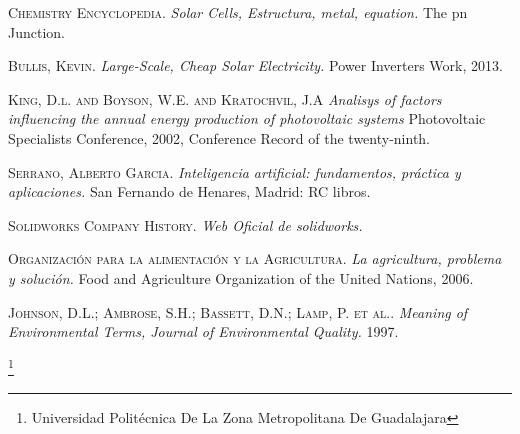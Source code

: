 \documentclass[11pt,a4paper]{article}
\begin{document}
\newpage

\begin{thebibliography}{X}

 \textsc{Chemistry Encyclopedia.} \textit{Solar Cells, Estructura, metal, equation.} The pn Junction.

 \textsc{Bullis, Kevin.} \textit{Large-Scale, Cheap Solar Electricity.} 
Power Inverters Work, 2013.


 \textsc{King, D.l. and Boyson, W.E. and Kratochvil, J.A} \textit{Analisys of factors influencing the annual energy production of photovoltaic systems} 
Photovoltaic Specialists Conference, 2002, Conference Record of the twenty-ninth.

 \textsc{Serrano, Alberto Garcia.} \textit{Inteligencia artificial: fundamentos, práctica y aplicaciones.} 
San Fernando de Henares, Madrid: RC libros.

 \textsc{Solidworks Company History.} \textit{Web Oficial de solidworks.} 

 \textsc{Organización para la alimentación y la Agricultura.} \textit{La agricultura, problema y solución.} 
Food and Agriculture Organization of the United Nations, 2006.

 \textsc{Johnson, D.L.; Ambrose, S.H.; Bassett, D.N.; Lamp, P. et al..} \textit{Meaning of Environmental Terms, Journal of Environmental Quality.} 
1997.

\end{thebibliography}




 \footnote{Universidad Politécnica De La Zona Metropolitana De Guadalajara} 
\newpage
\end{document}
